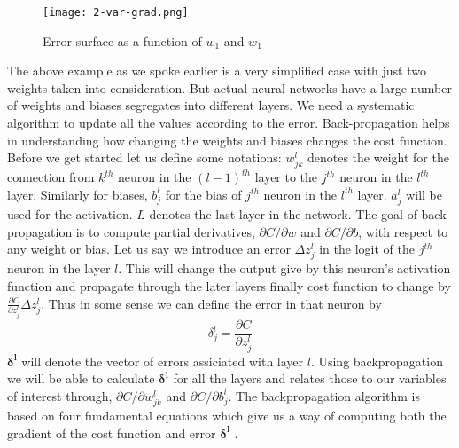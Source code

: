 \begin{figure}[!h]
	\centering
	\texttt{[image: 2-var-grad.png]}
	\hspace{1mm}
	\caption{Error surface as a function of $w_1$ and $w_1$} 
	\label{fig:err-surf}
\end{figure}
The above example as we spoke earlier is a very simplified case with just two weights taken into consideration. But actual neural networks have a large number of weights and biases segregates into different layers. We need a systematic algorithm to update all the values according to the error. Back-propagation helps in understanding how changing the weights and biases changes the cost function. Before we get started let us define some notations: $w_{jk}^l$ denotes the weight for the connection from $k^{th}$ neuron in the $(l-1)^{th}$ layer to the $j^{th}$ neuron in the $l^{th}$ layer. Similarly for biases, $b_j^l$ for the bias of $j^{th}$ neuron in the $l^{th}$ layer. $a_j^l$ will be used for the activation. $L$ denotes the last layer in the network. The goal of back-propagation is to compute partial derivatives, $\partial C/\partial w$ and $\partial C/\partial b$, with respect to any weight or bias. Let us say we introduce an error $\Delta z_j^l$ in the logit of the $j^{th}$ neuron in the layer $l$. This will change the output give by this neuron's activation function and propagate through the later layers finally cost function to change by $\frac{\partial C}{\partial z_j^l}\Delta z_j^l$. Thus in some sense we can define the error in that neuron by
\begin{equation}
\delta_j^l = \frac{\partial C}{\partial z_j^l}
\end{equation}
$\boldsymbol{\delta^l}$ will denote the vector of errors assiciated with layer $l$. Using backpropagation we will be able to calculate $\boldsymbol{\delta^l}$ for all the layers and relates those to our variables of interest through, $\partial C/\partial w_{jk}^{l}$ and $\partial C/\partial b_j^l$. The backpropagation algorithm is based on four fundamental equations which give us a way of computing both the gradient of the cost function and error $\boldsymbol{\delta^l}$ \cite{nielsen2015neural}.
